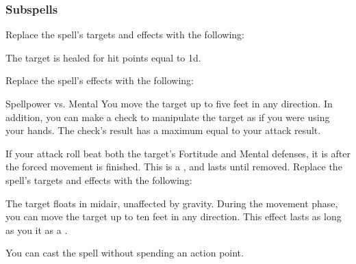 \subsubsection{Subspells}
Replace the spell's targets and effects with the following:
\begin{spellcontent}
\begin{augmenttargetinginfo}
\end{augmenttargetinginfo}
\begin{augmenteffects}
\spelleffect
The target is healed for hit points equal to  \plus1d.
\end{augmenteffects}
\end{spellcontent}
Replace the spell's effects with the following:
\begin{spellcontent}
\begin{augmenteffects}
\begin{spellattack}{Spellpower vs. Mental}
\spellsuccess
You move the target up to five feet in any direction.
In addition, you can make a check to manipulate the target as if you were using your hands.
The check's result has a maximum equal to your attack result.
\end{spellattack}
\end{augmenteffects}
\end{spellcontent}
If your attack roll beat both the target's Fortitude and Mental defenses, it is \immobilized after the forced movement is finished.
This is a , and lasts until removed.
Replace the spell's targets and effects with the following:
\begin{spellcontent}
\begin{augmenttargetinginfo}
\end{augmenttargetinginfo}
\begin{augmenteffects}
\spelleffect
The target floats in midair, unaffected by gravity.
During the movement phase, you can move the target up to ten feet in any direction.
This effect lasts as long as you  it as a .
\end{augmenteffects}
\end{spellcontent}
You can cast the spell without spending an action point.
